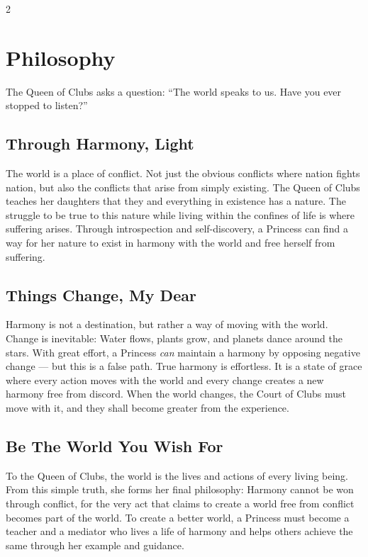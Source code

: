 \begin{multicols}{2}
\section*{Philosophy}
The Queen of Clubs asks a question: \textquotedblleft The world speaks to us. Have you ever stopped to listen?\textquotedblright

\subsection*{Through Harmony, Light}

The world is a place of conflict. Not just the obvious conflicts where nation fights nation, but also the conflicts that arise from simply existing. The Queen of Clubs teaches her daughters that they and everything in existence has a nature. The struggle to be true to this nature while living within the confines of life is where suffering arises. Through introspection and self-discovery, a Princess can find a way for her nature to exist in harmony with the world and free herself from suffering.

\subsection*{Things Change, My Dear}

Harmony is not a destination, but rather a way of moving with the world. Change is inevitable: Water flows, plants grow, and planets dance around the stars. With great effort, a Princess \textit{can} maintain a harmony by opposing negative change — but this is a false path. True harmony is effortless. It is a state of grace where every action moves with the world and every change creates a new harmony free from discord. When the world changes, the Court of Clubs must move with it, and they shall become greater from the experience.

\subsection*{Be The World You Wish For}

To the Queen of Clubs, the world is the lives and actions of every living being. From this simple truth, she forms her final philosophy: Harmony cannot be won through conflict, for the very act that claims to create a world free from conflict becomes part of the world. To create a better world, a Princess must become a teacher and a mediator who lives a life of harmony and helps others achieve the same through her example and guidance. 


\end{multicols}
